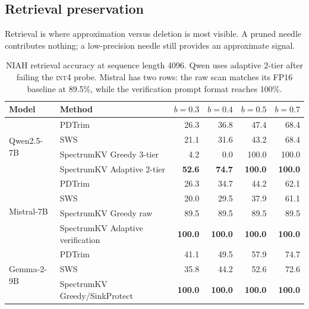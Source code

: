 \documentclass[11pt]{article}
\newcommand{\method}{SpectrumKV}
\newcommand{\niah}{NIAH}
\newcommand{\budget}{b}
\newcommand{\pct}{\%}
\newcommand{\intiv}{\textsc{int4}}
\theoremstyle{plain}
\theoremstyle{definition}
\begin{document}
\subsection{Retrieval preservation}
\label{sec:rq11}

Retrieval is where approximation versus deletion is most visible.  A pruned needle contributes nothing; a low-precision needle still provides an approximate signal.

\begin{table}[t]
\centering
\caption{\niah{} retrieval accuracy at sequence length 4096.  Qwen uses adaptive 2-tier after failing the \intiv{} probe.  Mistral has two rows: the raw scan matches its FP16 baseline at 89.5\pct{}, while the verification prompt format reaches 100\pct{}.}
\label{tab:niah}
\small
\begin{tabular}{llrrrr}
\toprule
Model & Method & $\budget=0.3$ & $\budget=0.4$ & $\budget=0.5$ & $\budget=0.7$ \\
\midrule
\multirow{4}{*}{Qwen2.5-7B}
  & PDTrim & 26.3 & 36.8 & 47.4 & 68.4 \\
  & SWS & 21.1 & 31.6 & 43.2 & 68.4 \\
  & \method{} Greedy 3-tier & 4.2 & 0.0 & 100.0 & 100.0 \\
  & \method{} Adaptive 2-tier & \textbf{52.6} & \textbf{74.7} & \textbf{100.0} & \textbf{100.0} \\
\midrule
\multirow{4}{*}{Mistral-7B}
  & PDTrim & 26.3 & 34.7 & 44.2 & 62.1 \\
  & SWS & 20.0 & 29.5 & 37.9 & 61.1 \\
  & \method{} Greedy raw & 89.5 & 89.5 & 89.5 & 89.5 \\
  & \method{} Adaptive verification & \textbf{100.0} & \textbf{100.0} & \textbf{100.0} & \textbf{100.0} \\
\midrule
\multirow{3}{*}{Gemma-2-9B}
  & PDTrim & 41.1 & 49.5 & 57.9 & 74.7 \\
  & SWS & 35.8 & 44.2 & 52.6 & 72.6 \\
  & \method{} Greedy/SinkProtect & \textbf{100.0} & \textbf{100.0} & \textbf{100.0} & \textbf{100.0} \\
\bottomrule
\end{tabular}
\end{table}
\end{document}
